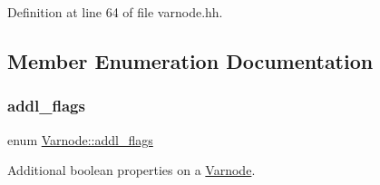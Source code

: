 Definition at line 64 of file varnode.\+hh.



\subsection{Member Enumeration Documentation}
\mbox{\label{class_varnode_a54e5d14b3fc1c7916863ba2a2d7ee900}} 
\subsubsection{\texorpdfstring{addl\_flags}{addl\_flags}}
{\footnotesize\ttfamily enum \mbox{\hyperlink{class_varnode_a54e5d14b3fc1c7916863ba2a2d7ee900}{Varnode\+::addl\+\_\+flags}}}



Additional boolean properties on a \mbox{\hyperlink{class_varnode}{Varnode}}. 

